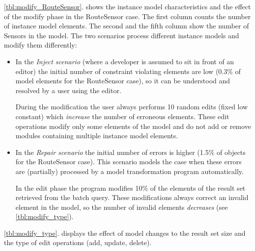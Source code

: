 \autoref{tbl:modify_RouteSensor}. shows the instance model characteristics and the effect of the modify phase in the \textsf{RouteSensor} case. The first column counts the number of instance model elements. The second and the fifth column show the number of Sensors in the model. The two scenarios process different instance models and modify them differently:

\begin{itemize}
	\item In the \emph{Inject scenario} (where a developer is assumed to sit in front of an editor) the initial number of constraint violating elements are low (0.3\% of model elements for the \textsf{RouteSensor} case), so it can be understood and resolved by a user using the editor.
	
	During the modification the user always performs 10 random edits (fixed low constant) which \emph{increase} the number of erroneous elements. These edit operations modify only some elements of the model and do not add or remove modules containing multiple instance model elements.

	\item In the \emph{Repair scenario} the initial number of errors is higher (1.5\% of objects for the \textsf{RouteSensor} case). This scenario models the case when these errors are (partially) processed by a model transformation program automatically.

	In the edit phase the program modifies 10\% of the elements of the result set retrieved from the batch query. These modifications always correct an invalid element in the model, so the number of invalid elements \emph{decreases} (see \autoref{tbl:modify_type}).

\end{itemize}


\autoref{tbl:modify_type}. displays the effect of model changes to the result set size and the type of edit operations (add, update, delete).

